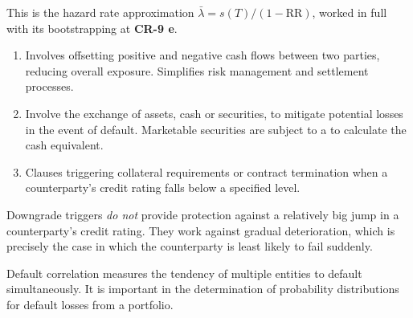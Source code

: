 
This is the hazard rate approximation $\bar{\lambda} = s(T)/(1-\mathrm{RR})$,
worked in full with its bootstrapping at \textbf{CR-9 e}.


\begin{enumerate}
\item {} Involves offsetting positive and negative cash flows
between two parties, reducing overall exposure. Simplifies risk management and
settlement processes.
\item {} Involve the exchange of assets, cash or
securities, to mitigate potential losses in the event of default. Marketable
securities are subject to a  to calculate the cash equivalent.
\item {} Clauses triggering collateral requirements or
contract termination when a counterparty's credit rating falls below a specified
level.
\end{enumerate}

\begin{crtrapbox}
Downgrade triggers \emph{do not} provide protection against a relatively big jump
in a counterparty's credit rating. They work against gradual deterioration, which
is precisely the case in which the counterparty is least likely to fail suddenly.
\end{crtrapbox}


Default correlation measures the tendency of multiple entities to default
simultaneously. It is important in the determination of probability distributions
for default losses from a portfolio.

